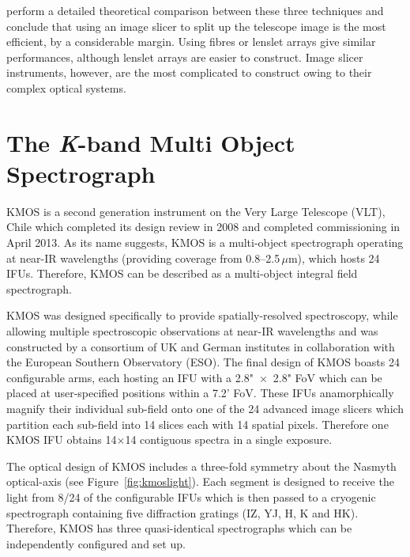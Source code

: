 \cite{2006NewAR..50..244A} perform a detailed theoretical comparison between these three techniques and conclude that using an image slicer to split up the telescope image is the most efficient, by a considerable margin.
Using fibres or lenslet arrays give similar performances, although lenslet arrays are easier to construct.
Image slicer instruments, however, are the most complicated to construct owing to their complex optical systems.





\section{The {\it K}-band Multi Object Spectrograph} %
\label{sec:KMOS}
KMOS is a second generation instrument on the Very Large Telescope (VLT), Chile which completed its design review in 2008 and completed commissioning in April 2013.
As its name suggests, KMOS is a multi-object spectrograph operating at near-IR wavelengths (providing coverage from 0.8--2.5\,$\mu$m), which hosts 24 IFUs.
Therefore, KMOS can be described as a multi-object integral field spectrograph.

KMOS was designed specifically to provide spatially-resolved spectroscopy, while allowing multiple spectroscopic observations at near-IR wavelengths and was constructed by a consortium of UK and German institutes in collaboration with the European Southern Observatory (ESO).
The final design of KMOS boasts 24 configurable arms, each hosting an IFU with a 2.8"~$\times$~2.8" FoV which can be placed at user-specified positions within a 7.2' FoV.
These IFUs anamorphically magnify their individual sub-field onto one of the 24 advanced image slicers which partition each sub-field into 14 slices each with 14 spatial pixels.
Therefore one KMOS IFU obtains 14$\times$14 contiguous spectra in a single exposure.

The optical design of KMOS includes a three-fold symmetry about the Nasmyth optical-axis (see Figure~\ref{fig:kmoslight}).
Each segment is designed to receive the light from 8/24 of the configurable IFUs which is then passed to a cryogenic spectrograph containing five diffraction gratings (IZ, YJ, H, K and HK).
Therefore, KMOS has three quasi-identical spectrographs which can be independently configured and set up.

